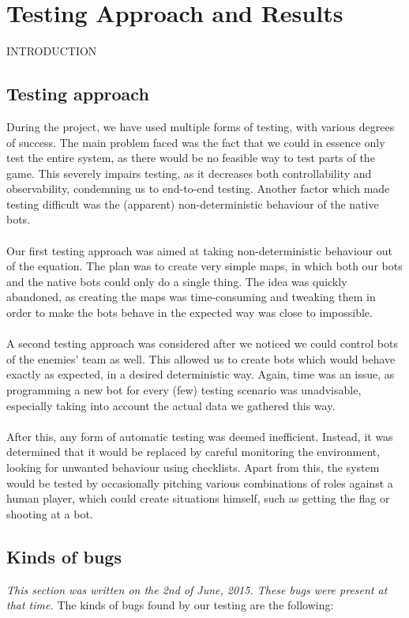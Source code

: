 \chapter{Testing Approach and Results}

INTRODUCTION

\section{Testing approach}
During the project, we have used multiple forms of testing, with various degrees of success. The main problem faced was the fact that we could in essence only test the entire system, as there would be no feasible way to test parts of the game. This severely impairs testing, as it decreases both controllability and observability, condemning us to end-to-end testing. Another factor which made testing difficult was the (apparent) non-deterministic behaviour of the native bots.\\
\\
Our first testing approach was aimed at taking non-deterministic behaviour out of the equation. The plan was to create very simple maps, in which both our bots and the native bots could only do a single thing. The idea was quickly abandoned, as creating the maps was time-consuming and tweaking them in order to make the bots behave in the expected way was close to impossible.\\
\\
A second testing approach was considered after we noticed we could control bots of the enemies' team as well. This allowed us to create bots which would behave exactly as expected, in a desired deterministic way. Again, time was an issue, as programming a new bot for every (few) testing scenario was unadvisable, especially taking into account the actual data we gathered this way.\\
\\
After this, any form of automatic testing was deemed inefficient. Instead, it was determined that it would be replaced by careful monitoring the environment, looking for unwanted behaviour using checklists. Apart from this, the system would be tested by occasionally pitching various combinations of roles against a human player, which could create situations himself, such as getting the flag or shooting at a bot.\\

\section{Kinds of bugs}
\emph{This section was written on the 2nd of June, 2015. These bugs were present at that time.}
\newline\newline
The kinds of bugs found by our testing are the following:

